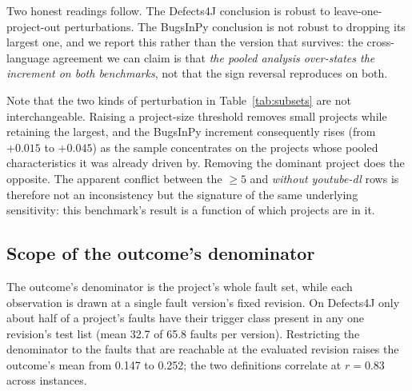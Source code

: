 \documentclass[preprint,12pt]{elsarticle}
\begin{document}
Two honest readings follow. The Defects4J conclusion is robust to
leave-one-project-out perturbations. The BugsInPy conclusion is not robust
to dropping its largest one, and we report this rather than the version
that survives: the cross-language agreement we can claim is that \emph{the
pooled analysis over-states the increment on both benchmarks}, not that the
sign reversal reproduces on both.

Note that the two kinds of perturbation in Table~\ref{tab:subsets} are not
interchangeable. Raising a project-size threshold removes small projects
while retaining the largest, and the BugsInPy increment consequently rises
(from $+0.015$ to $+0.045$) as the sample concentrates on the projects
whose pooled characteristics it was already driven by. Removing the
dominant project does the opposite. The apparent conflict between the
$\geq 5$ and \emph{without youtube-dl} rows is therefore not an
inconsistency but the signature of the same underlying sensitivity: this
benchmark's result is a function of which projects are in it.

\subsection{Scope of the outcome's denominator}

The outcome's denominator is the project's whole fault set, while each
observation is drawn at a single fault version's fixed revision. On
Defects4J only about half of a project's faults have their trigger class
present in any one revision's test list (mean \num{32.7} of \num{65.8} faults
per version). Restricting the denominator to the faults that are reachable
at the evaluated revision raises the outcome's mean from \num{0.147} to
\num{0.252}; the two definitions correlate at $r = \num{0.83}$ across
instances.
\end{document}
